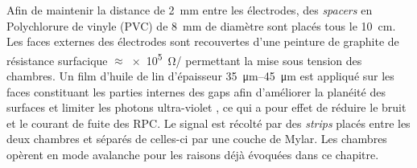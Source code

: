 Afin de maintenir la distance de \SI{2}{\milli\meter} entre les électrodes, des \textit{spacers} en Polychlorure de vinyle (PVC) de \SI{8}{\milli\meter} de diamètre sont placés tous le \SI{10}{\centi\meter}. Les faces externes des électrodes sont recouvertes d'une peinture de graphite de résistance surfacique $\approx$\SI{e5}{\ohm/\sq} permettant la mise sous tension des chambres. Un film d'huile de lin d'épaisseur \SIrange{35}{45}{\micro\meter} est appliqué sur les faces constituant les parties internes des gaps afin d'améliorer la planéité des surfaces \cite{oil} et limiter les photons ultra-violet \cite{Lu:2009zzd}, ce qui a pour effet  de réduire le bruit et le courant de fuite des RPC.
Le signal est récolté par des \textit{strips} placés entre les deux chambres et séparés de celles-ci par une couche de Mylar. Les chambres opèrent en mode avalanche pour les raisons déjà évoquées dans ce chapitre.

